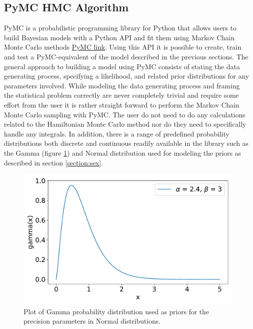 \documentclass[a4paper,11pt, oneside]{article}
\theoremstyle{definition}
\begin{document}
	\subsection{PyMC HMC Algorithm}
	PyMC is a probabilistic programming library for Python that allows users to build Bayesian models with a Python API and fit them using Markov Chain Monte Carlo methods \href{https://www.pymc.io/welcome.html}{PyMC link}. Using this API it is possible to create, train and test a PyMC-equivalent of the model described in the previous sections. The general approach to building a model using PyMC consists of stating the data generating process, specifying a likelihood, and related prior distributions for any parameters involved. While modeling the data generating process and framing the statistical problem correctly are never completely trivial and require some effort from the user it is rather straight forward to perform the Markov Chain Monte Carlo sampling with PyMC. The user do not need to do any calculations related to the Hamiltonian Monte Carlo method nor do they need to specifically handle any integrals. In addition, there is a range of predefined probability distributions both discrete and continuous readily available in the library such as the Gamma (figure \ref{fig:gamma}) and Normal distribution used for modeling the priors as described in section \ref{section:sex}.
	\begin{figure}[H]
		\centering
		\includegraphics[width = 1\textwidth]{figures/gamma_dist.pdf}
		\caption{Plot of Gamma probability distribution used as priors for the precision parameters in Normal distributions.}
		\label{fig:gamma}
	\end{figure}
\end{document}
